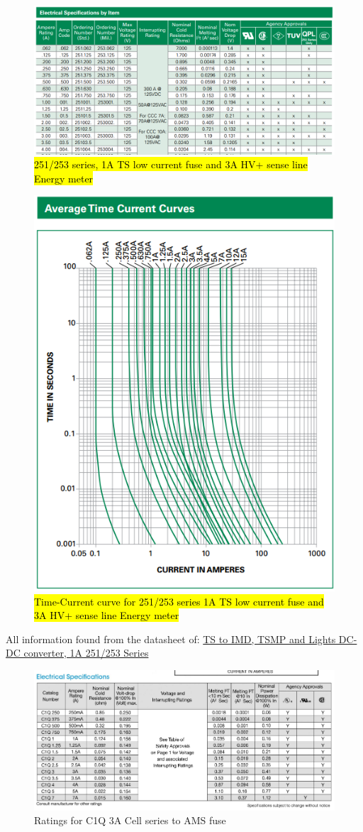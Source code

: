 \documentclass{article}
\DeclareRobustCommand{\hlr}[1]{{\sethlcolor{red}\hl{#1}}}
\begin{document}
\begin{figure}[H]
    \centering
    \includegraphics[width = 0.6 \textwidth]{TSsmallratings}
    \caption{\hlr{251/253 series, 1A TS low current fuse and 3A HV+ sense line Energy meter}}
    \label{tssmallratings}
\end{figure}

\begin{figure}[H]
    \centering
    \includegraphics[width = 0.6 \textwidth]{TSsmallmeltingtime}
    \caption{\hlr{Time-Current curve for 251/253 series 1A TS low current fuse and 3A HV+ sense line Energy meter}}
    \label{TSsmallcurve}
\end{figure}

All information found from the datasheet of:
\href{http://www.littelfuse.com/~/media/electronics/datasheets/fuses/littelfuse_fuse_251_253_datasheet.pdf.pdf}{TS to IMD, TSMP and Lights DC-DC converter, 1A 251/253 Series}

\begin{figure}[H]
    \centering
    \includegraphics[width = 0.6 \textwidth]{AMSfuseratings}
    \caption{Ratings for C1Q 3A Cell series to AMS fuse}
    \label{amsfuseratings}
\end{figure}
\end{document}
